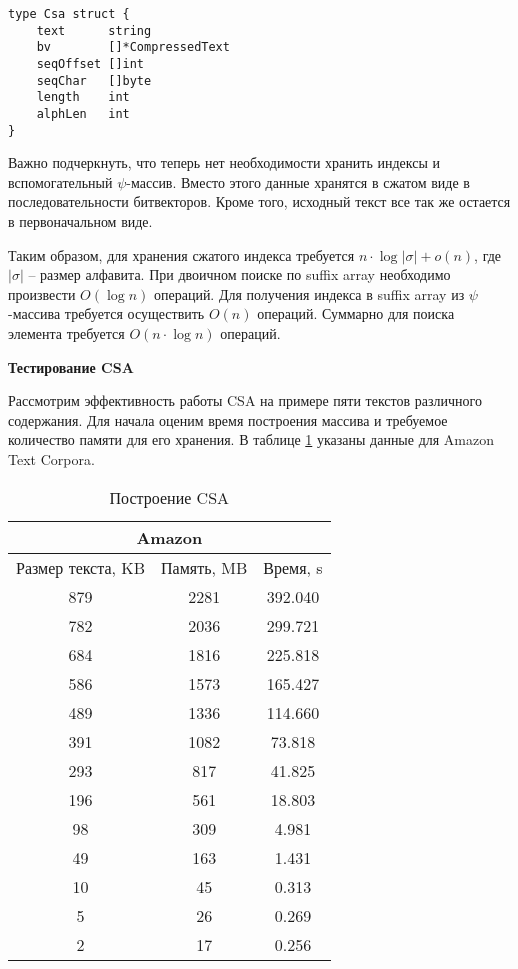 \newpage
\begin{lstlisting}[caption=CSA structure]
type Csa struct {
	text      string
	bv        []*CompressedText
	seqOffset []int
	seqChar   []byte
	length    int
	alphLen   int
}
\end{lstlisting}

Важно подчеркнуть, что теперь нет необходимости хранить индексы и вспомогательный $\psi$-массив.
Вместо этого данные хранятся в сжатом виде в последовательности битвекторов.
Кроме того, исходный текст все так же остается в первоначальном виде.

Таким образом, для хранения сжатого индекса требуется $n \cdot \log |\sigma| + o(n)$,
где $|\sigma|$ -- размер алфавита. При двоичном поиске по suffix array необходимо произвести $O(\log n)$ операций.
Для получения индекса в suffix array из $\psi$-массива требуется осуществить $O(n)$ операций.
Суммарно для поиска элемента требуется $O(n\cdot \log n)$ операций.

\textbf{Тестирование CSA}

Рассмотрим эффективность работы CSA на примере пяти текстов различного содержания.
Для начала оценим время построения массива и требуемое количество памяти для его хранения.
В таблице \ref{table:6} указаны данные для Amazon Text Corpora.


\begin{table}[h!]
	\centering
	\begin{tabular}{|c|c|c|}
		\hline
		\multicolumn{3}{|c|}{Amazon} \\
		\hline
		Размер текста, KB & Память, MB & Время, s\\
		\hline
		879 & 2281 & 392.040\\
		\hline
		782 & 2036 & 299.721\\
		\hline
		684 & 1816 & 225.818\\
		\hline
		586 & 1573 & 165.427\\
		\hline
		489 & 1336 & 114.660\\
		\hline
		391 & 1082 & 73.818\\
		\hline
		293 & 817 & 41.825\\
		\hline
		196 & 561 & 18.803\\
		\hline
		98 & 309 & 4.981\\
		\hline
		49 & 163 & 1.431\\
		\hline
		10 & 45 & 0.313\\
		\hline
		5 & 26 & 0.269\\
		\hline
		2 & 17 & 0.256\\
		\hline
	\end{tabular}
	\caption{Построение CSA}
	\label{table:6}
\end{table}

